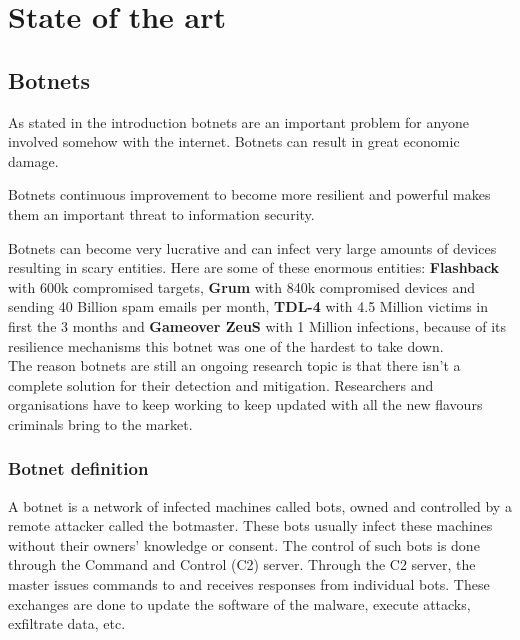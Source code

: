 
\chapter{State of the art}

\label{State of the art}

\section{Botnets}
As stated in the introduction botnets are an important problem for anyone involved somehow with the internet. Botnets can result in great economic damage. 

Botnets continuous improvement to become more resilient and powerful makes them an important threat to information security.

Botnets can become very lucrative and can infect very large amounts of devices resulting in scary entities.
Here are some of these enormous entities: \textbf{Flashback} with 600k compromised targets, \textbf{Grum} with 840k compromised devices and sending 40 Billion spam emails per month, \textbf{TDL-4} with 4.5 Million victims in first the 3 months and \textbf{Gameover ZeuS} with 1 Million infections, because of its resilience mechanisms this botnet was one of the hardest to take down.\\

The reason botnets are still an ongoing research topic is that there isn't a complete solution for their detection and mitigation. Researchers and organisations have to keep working to keep updated with all the new flavours criminals bring to the market.

\subsection{Botnet definition}  
A botnet is a network of infected machines called bots, owned and controlled by a remote attacker called the botmaster. These bots usually infect these machines without their owners' knowledge or consent\cite{Botnet1}. The control of such bots is done through the Command and Control (C2) server. Through the C2 server, the master issues commands to and receives responses from individual bots. These exchanges are done to update the software of the malware, execute attacks, exfiltrate data, etc.

